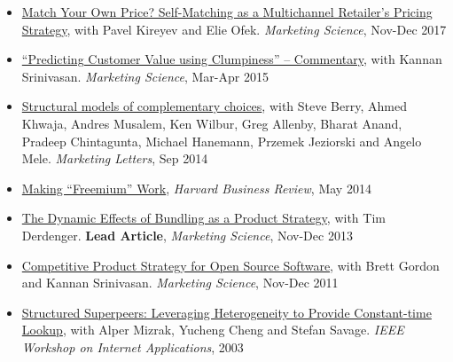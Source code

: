 \documentclass[margin, line, centered, 10pt]{res}
\begin{document}
\begin{resume}
\begin{itemize}
\item \href{http://vineetkumars.github.io/Papers/MultichannelPriceMatching.pdf}{Match Your Own Price? Self-Matching as a Multichannel Retailer's Pricing Strategy}, with Pavel Kireyev and Elie Ofek. \textit{Marketing Science}, Nov-Dec 2017
\item  \href{http://vineetkumars.github.io/Papers/ClumpinessCommentary.pdf}{``Predicting Customer Value using Clumpiness'' -- Commentary,} with Kannan Srinivasan. \textit{Marketing Science}, Mar-Apr 2015
\item \href{http://vineetkumars.github.io/Papers/ComplementaryChoices.pdf}
{Structural models of complementary choices}, with Steve Berry, Ahmed Khwaja, Andres Musalem, Ken Wilbur, Greg Allenby, Bharat Anand, Pradeep Chintagunta, Michael Hanemann, Przemek Jeziorski and Angelo Mele. \textit{Marketing Letters}, Sep 2014
\item \href{http://vineetkumars.github.io/Papers/Freemium_May2014_Kumar.pdf}{Making ``Freemium'' Work}, \textit{Harvard Business Review}, May 2014
\item \href{http://vineetkumars.github.io/Papers/DynamicBundling.pdf}{The Dynamic Effects of Bundling as a Product Strategy}, with Tim Derdenger. \textbf{Lead Article},  \textit{Marketing Science}, Nov-Dec 2013
\item \href{http://vineetkumars.github.io/Papers/CompetitiveStrategyOS.pdf}{Competitive Product Strategy for Open Source Software}, with Brett Gordon and Kannan Srinivasan. \textit{Marketing Science}, Nov-Dec 2011
\item \href{http://vineetkumars.github.io/Papers/WIAPP03.pdf}{Structured Superpeers: Leveraging Heterogeneity to Provide Constant-time Lookup}, with Alper Mizrak, Yucheng Cheng and Stefan Savage. \textit{IEEE Workshop on Internet Applications}, 2003
\end{itemize}


\end{resume}
\end{document}
